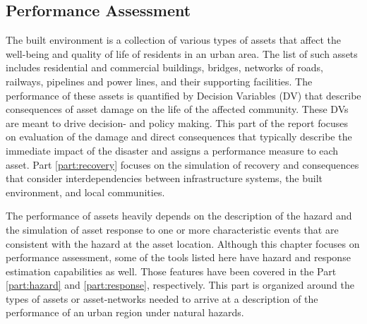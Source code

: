 
\begin{partbacktext}
\part{Performance Assessment}\label{part:Performance}

The built environment is a collection of various types of assets that affect the well-being and quality of life of residents in an urban area. The list of such assets includes residential and commercial buildings, bridges, networks of roads, railways, pipelines and power lines, and their supporting facilities. The performance of these assets is quantified by Decision Variables (DV) that describe consequences of asset damage on the life of the affected community. These DVs are meant to drive decision- and policy making. This part of the report focuses on evaluation of the damage and direct consequences that typically describe the immediate impact of the disaster and assigns a performance measure to each asset. Part \ref{part:recovery} focuses on the simulation of recovery and consequences that consider interdependencies between infrastructure systems, the built environment, and local communities. 

The performance of assets heavily depends on the description of the hazard and the simulation of asset response to one or more characteristic events that are consistent with the hazard at the asset location. Although this chapter focuses on performance assessment, some of the tools listed here have hazard and response estimation capabilities as well. Those features have been covered in the Part \ref{part:hazard} and \ref{part:response}, respectively. This part is organized around the types of assets or asset-networks needed to arrive at a description of the performance of an urban region under natural hazards. 


\end{partbacktext}
